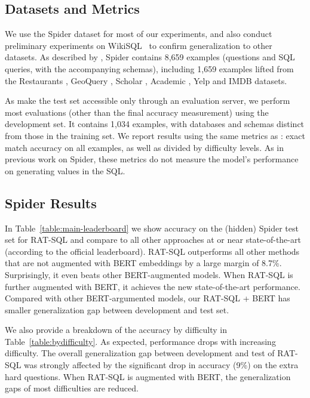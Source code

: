 \documentclass[11pt,a4paper,final]{article}
\begin{document}
\subsection{Datasets and Metrics}
We use the Spider dataset \citep{data-spider} for most of our experiments, and also conduct preliminary experiments on
WikiSQL~\citep{zhongSeq2SQLGeneratingStructured2017}
to confirm generalization to other datasets.
As described by \citeauthor{data-spider}, Spider contains 8,659 examples (questions and SQL
queries, with the accompanying schemas), including 1,659 examples lifted from the Restaurants
\citep{data-restaurants-original,data-restaurants-logic}, GeoQuery \citep{data-geography-original}, Scholar
\citep{data-atis-geography-scholar}, Academic \citep{data-academic},
Yelp and IMDB \citep{data-sql-imdb-yelp} datasets.


As \citet{data-spider} make the test set accessible only through an evaluation server, we perform most evaluations (other than the final accuracy measurement) using the development set.
It contains 1,034 examples, with databases and schemas distinct from those in the training set.
We report results using the same metrics as \citet{yuSyntaxSQLNetSyntaxTree2018}:
exact match accuracy on all examples, as well as divided by difficulty levels.
As in previous work on Spider, these metrics do not measure the model's performance on generating values in the SQL.


\subsection{Spider Results}


In Table~\ref{table:main-leaderboard} we show accuracy on the (hidden) Spider test set for RAT-SQL and compare to all other approaches at or near state-of-the-art (according to the official leaderboard).
RAT-SQL outperforms all other methods that are not augmented with BERT embeddings by a large margin of 8.7\%.
Surprisingly, it even beats other BERT-augmented models.
When RAT-SQL is further augmented with BERT, it achieves the new state-of-the-art performance.
Compared with other BERT-argumented models, our RAT-SQL + BERT has smaller generalization gap between development and test set.

We also provide a breakdown of the accuracy by difficulty in Table~\ref{table:bydifficulty}.
As expected, performance drops with increasing difficulty.
The overall generalization gap between development and test of RAT-SQL was strongly affected by the significant drop in
accuracy (9\%) on the extra hard questions.
When RAT-SQL is augmented with BERT, the generalization gaps of
most difficulties are reduced.
\end{document}
